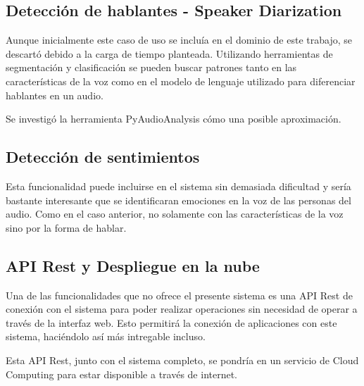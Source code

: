 \documentclass[../main.tex]{subfiles}
\begin{document}
\subsection{Detección de hablantes - Speaker Diarization}
Aunque inicialmente este caso de uso se incluía en el dominio de este trabajo, se descartó debido a la carga de tiempo planteada. Utilizando herramientas de segmentación y clasificación se pueden buscar patrones tanto en las características de la voz como en el modelo de lenguaje utilizado para diferenciar hablantes en un audio. 

Se investigó la herramienta PyAudioAnalysis\cite{Giannakopoulos2015} cómo una posible aproximación.

\subsection{Detección de sentimientos}
Esta funcionalidad puede incluirse en el sistema sin demasiada dificultad y sería bastante interesante que se identificaran emociones en la voz de las personas del audio. Como en el caso anterior, no solamente con las características de la voz sino por la forma de hablar.

\subsection{API Rest y Despliegue en la nube}
Una de las funcionalidades que no ofrece el presente sistema es una API Rest de conexión con el sistema para poder realizar operaciones sin necesidad de operar a través de la interfaz web. Esto permitirá la conexión de aplicaciones con este sistema, haciéndolo así más intregable incluso.

Esta API Rest, junto con el sistema completo, se pondría en un servicio de Cloud Computing para estar disponible a través de internet.
\end{document}
